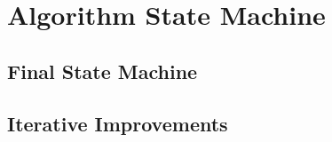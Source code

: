 \section{Algorithm State Machine}\label{sec:stateMachine}
\subsection{Final State Machine}\label{subsec:SMfinalStateMachine}
\subsection{Iterative Improvements}\label{subsec:SMiterativeImprovements}